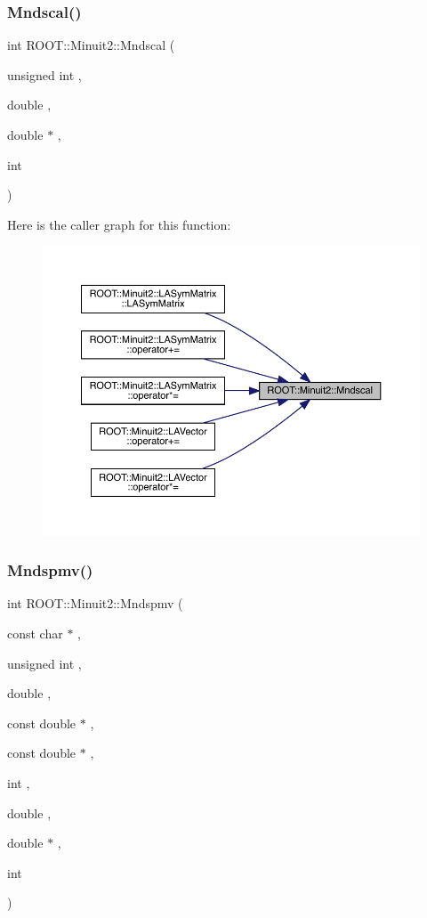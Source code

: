 \subsubsection{\texorpdfstring{Mndscal()}{Mndscal()}}
{\footnotesize\ttfamily int R\+O\+O\+T\+::\+Minuit2\+::\+Mndscal (\begin{DoxyParamCaption}\item[{unsigned int}]{,  }\item[{double}]{,  }\item[{double $\ast$}]{,  }\item[{int}]{ }\end{DoxyParamCaption})}

Here is the caller graph for this function\+:\nopagebreak
\begin{figure}[H]
\begin{center}
\leavevmode
\includegraphics[width=350pt]{d6/d3a/namespaceROOT_1_1Minuit2_a8d430fbbb8b24669bd04e922230451ff_icgraph}
\end{center}
\end{figure}
\mbox{\label{namespaceROOT_1_1Minuit2_ad193f5f7fa4c96ebf1fe98c72ab22ca2}} 
\subsubsection{\texorpdfstring{Mndspmv()}{Mndspmv()}}
{\footnotesize\ttfamily int R\+O\+O\+T\+::\+Minuit2\+::\+Mndspmv (\begin{DoxyParamCaption}\item[{const char $\ast$}]{,  }\item[{unsigned int}]{,  }\item[{double}]{,  }\item[{const double $\ast$}]{,  }\item[{const double $\ast$}]{,  }\item[{int}]{,  }\item[{double}]{,  }\item[{double $\ast$}]{,  }\item[{int}]{ }\end{DoxyParamCaption})}

